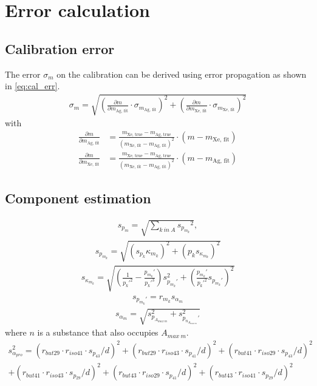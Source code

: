 \section{Error calculation}
\label{app:err}
\subsection{Calibration error}
\label{app:err_cal}
The error $\sigma_{m}$ on the calibration can be derived using error propagation as shown in \eqref{eq:cal_err}.
\begin{align}
    \sigma_m = \sqrt{ \left(\frac{\partial m}{\partial m_\text{Ag, fit}}\cdot \sigma_{m_\text{Ag, fit}}\right)^2 + \left(\frac{\partial m}{\partial m_\text{Xe, fit}}\cdot \sigma_{m_\text{Xe, fit}}\right)^2}
    \label{eq:cal_err}
\end{align}
with
\begin{align}
     \frac{\partial m}{\partial m_\text{Ag, fit}} &= \frac{m_\text{Xe, true} - m_\text{Ag, true}}{(m_\text{Xe, fit} - m_\text{Ag, fit})^2} \cdot (m-m_\text{Xe, fit}) \\
    \frac{\partial m}{\partial m_\text{Xe, fit}} &= \frac{m_\text{Xe, true} - m_\text{Ag, true}}{(m_\text{Xe, fit} - m_\text{Ag, fit})^2} \cdot (m-m_\text{Ag, fit})
\end{align}

\subsection{Component estimation}
\label{app:err_comp}


\begin{align}
    s_{p_m} =\sqrt{ \sum_{k~in~A} {s_{p_{m_k}}}^2}, 
\end{align}
\begin{align}
    {s_{p_{m_k}}} = \sqrt{({s_{p_k}} \kappa_{m_k})^2 + ({p_k} s_{\kappa_{m_k}})^2}
\end{align}
\begin{align}
    s_{\kappa_{m_k}} = \sqrt{(\frac{1}{p_k'^2}- \frac{p_{m_k}'}{p_k'^3})s_{p_{m_k}'}^2 +  (\frac{p_{m_k}'}{p_k'^2} s_{p_{m_k}'})^2}
\end{align}
\begin{align}
    s_{p_{m_k}'} = r_{m_k} s_{\alpha_m}
\end{align}
\begin{align}
    s_{\alpha_m} = \sqrt{s_{p_{A_{max~m}}}^2 + s_{p_{n_{A_{max~m}}}'}^2}
\end{align}
where $n$ is a substance that also occupies $A_{max~m}$. 
\begin{align}
     s_{\alpha_{pro}}^2= (r_{but29} \cdot r_{iso41} \cdot s_{p_{43}} / d)^2 +  (r_{but29} \cdot r_{iso43} \cdot s_{p_{41}} / d)^2 + ( r_{but41} \cdot r_{iso29} \cdot s_{p_{43}}/d)^2 \\ \nonumber
     + ( r_{but41} \cdot r_{iso43} \cdot s_{p_{29}}/d)^2 +  (r_{but43} \cdot r_{iso29} \cdot s_{p_{41}}/d)^2 + (r_{but43} \cdot r_{iso41} \cdot  s_{p_{29}}/d)^2
\end{align}

